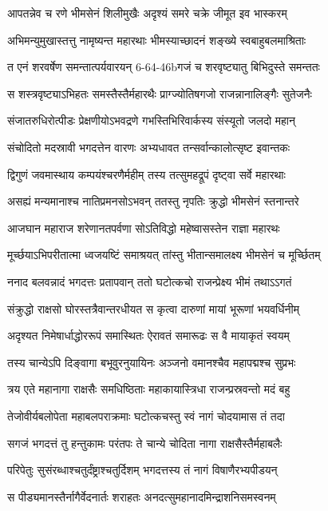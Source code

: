 \twolineshloka
{आपतन्नेव च रणे भीमसेनं शिलीमुखैः}
{अदृश्यं समरे चक्रे जीमूत इव भास्करम्}


\twolineshloka
{अभिमन्युमुखास्तत्तु नामृष्यन्त महारथाः}
{भीमस्याच्छादनं शङ्ख्ये स्वबाहुबलमाश्रिताः}


\twolineshloka
{त एनं शरवर्षेण समन्तात्पर्यवारयन्}
{6-64-46bगजं च शरवृष्ट्यातु बिभिदुस्ते समन्ततः}


\twolineshloka
{स शस्त्रवृष्ट्याऽभिहतः समस्तैस्तैर्महारथैः}
{प्राग्ज्योतिषगजो राजन्नानालिङ्गैः सुतेजनैः}


\twolineshloka
{संजातरुधिरोत्पीडः प्रेक्षणीयोऽभवद्रणे}
{गभस्तिभिरिवार्कस्य संस्यूतो जलदो महान्}


\twolineshloka
{संचोदितो मदस्रावी भगदत्तेन वारणः}
{अभ्यधावत तन्सर्वान्कालोत्सृष्ट इवान्तकः}


\twolineshloka
{द्विगुणं जवमास्थाय कम्पयंश्चरणैर्महीम्}
{तस्य तत्सुमहद्रूपं दृष्ट्वा सर्वे महारथाः}


\twolineshloka
{असह्यं मन्यमानाश्च नातिप्रमनसोऽभवन्}
{ततस्तु नृपतिः क्रुद्धो भीमसेनं स्तनान्तरे}


\threelineshloka
{आजघान महाराज शरेणानतपर्वणा}
{सोऽतिविद्धो महेष्वासस्तेन राज्ञा महारथः}
{}


\twolineshloka
{मूर्च्छयाऽभिपरीतात्मा ध्वजयष्टिं समाश्रयत्}
{तांस्तु भीतान्समालक्ष्य भीमसेनं च मूर्च्छितम्}


\twolineshloka
{ननाद बलवन्नादं भगदत्तः प्रतापवान्}
{ततो घटोत्कचो राजन्प्रेक्ष्य भीमं तथाऽऽगतं}


\twolineshloka
{संक्रुद्धो राक्षसो घोरस्तत्रैवान्तरधीयत}
{स कृत्वा दारुणां मायां भूरूणां भयवर्धिनीम्}


\twolineshloka
{अदृश्यत निमेषार्धाद्धोररूपं समास्थितः}
{ऐरावतं समारूढः स वै मायाकृतं स्वयम्}


\twolineshloka
{तस्य चान्येऽपि दिङ्वागा बभूवुरनुयायिनः}
{अञ्जनो वमानश्चैव महापद्मश्च सुप्रभः}


\twolineshloka
{त्रय एते महानागा राक्षसैः समधिष्ठिताः}
{महाकायास्त्रिधा राजन्प्रस्रवन्तो मदं बहु}


\twolineshloka
{तेजोवीर्यबलोपेता महाबलपराक्रमाः}
{घटोत्कचस्तु स्वं नागं चोदयामास तं तदा}


\twolineshloka
{सगजं भगदत्तं तु हन्तुकामः परंतपः}
{ते चान्ये चोदिता नागा राक्षसैस्तैर्महाबलैः}


\twolineshloka
{परिपेतुः सुसंरब्धाश्चतुर्दंष्ट्राश्चतुर्दिशम्}
{भगदत्तस्य तं नागं विषाणैरभ्यपीडयन्}


\twolineshloka
{स पीड्यमानस्तैर्नागैर्वेदनार्तः शराहतः}
{अनदत्सुमहानादमिन्द्राशनिसमस्वनम्}


